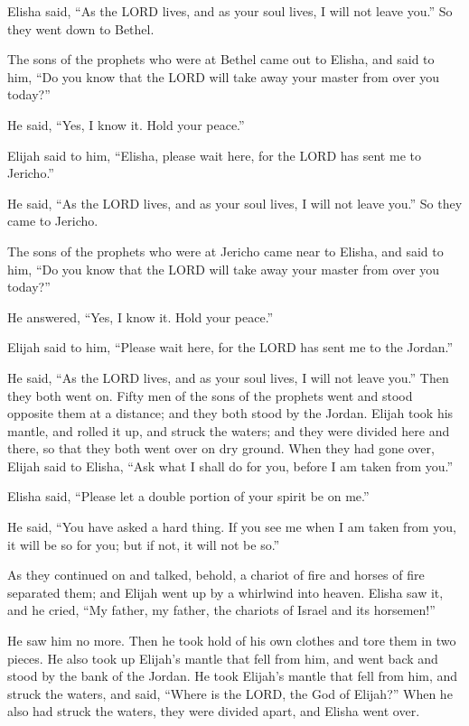 Elisha said, ``As the LORD lives, and as your soul lives, I will not
leave you.'' So they went down to Bethel.

 The sons of the prophets who were at Bethel came out to
Elisha, and said to him, ``Do you know that the LORD will take away your
master from over you today?''

He said, ``Yes, I know it. Hold your peace.''

 Elijah said to him, ``Elisha, please wait here, for the
LORD has sent me to Jericho.''

He said, ``As the LORD lives, and as your soul lives, I will not leave
you.'' So they came to Jericho.

 The sons of the prophets who were at Jericho came near to
Elisha, and said to him, ``Do you know that the LORD will take away your
master from over you today?''

He answered, ``Yes, I know it. Hold your peace.''

 Elijah said to him, ``Please wait here, for the LORD has
sent me to the Jordan.''

He said, ``As the LORD lives, and as your soul lives, I will not leave
you.'' Then they both went on.  Fifty men of the sons of
the prophets went and stood opposite them at a distance; and they both
stood by the Jordan.  Elijah took his mantle, and rolled
it up, and struck the waters; and they were divided here and there, so
that they both went over on dry ground.  When they had
gone over, Elijah said to Elisha, ``Ask what I shall do for you, before
I am taken from you.''

Elisha said, ``Please let a double portion of your spirit be on me.''

 He said, ``You have asked a hard thing. If you see me
when I am taken from you, it will be so for you; but if not, it will not
be so.''

 As they continued on and talked, behold, a chariot of
fire and horses of fire separated them; and Elijah went up by a
whirlwind into heaven.  Elisha saw it, and he cried, ``My
father, my father, the chariots of Israel and its horsemen!''

He saw him no more. Then he took hold of his own clothes and tore them
in two pieces.  He also took up Elijah's mantle that fell
from him, and went back and stood by the bank of the Jordan.
 He took Elijah's mantle that fell from him, and struck
the waters, and said, ``Where is the LORD, the God of Elijah?'' When he
also had struck the waters, they were divided apart, and Elisha went
over.

